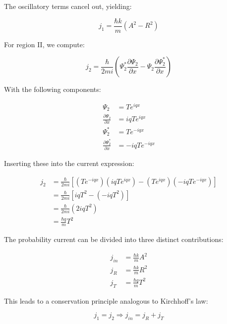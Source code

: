 \documentclass[10pt]{article}
\begin{document}
The oscillatory terms cancel out, yielding:

\begin{equation*}
j_{1}=\frac{\hbar k}{m}\left(A^{2}-R^{2}\right) \tag{6.22}
\end{equation*}

For region II, we compute:

\begin{equation*}
j_{2}=\frac{\hbar}{2 m i}\left(\Psi_{2}^{*} \frac{\partial \Psi_{2}}{\partial x}-\Psi_{2} \frac{\partial \Psi_{2}^{*}}{\partial x}\right) \tag{6.23}
\end{equation*}

With the following components:

\begin{align*}
\Psi_{2} & =T e^{i q x} \\
\frac{\partial \Psi_{2}}{\partial x} & =i q T e^{i q x}  \tag{6.24}\\
\Psi_{2}^{*} & =T e^{-i q x} \\
\frac{\partial \Psi_{2}^{*}}{\partial x} & =-i q T e^{-i q x}
\end{align*}

Inserting these into the current expression:

\begin{align*}
j_{2} & =\frac{\hbar}{2 m i}\left[\left(T e^{-i q x}\right)\left(i q T e^{i q x}\right)-\left(T e^{i q x}\right)\left(-i q T e^{-i q x}\right)\right] \\
& =\frac{\hbar}{2 m i}\left[i q T^{2}-\left(-i q T^{2}\right)\right]  \tag{6.25}\\
& =\frac{\hbar}{2 m i}\left(2 i q T^{2}\right) \\
& =\frac{\hbar q}{m} T^{2}
\end{align*}

The probability current can be divided into three distinct contributions:

\begin{align*}
j_{i n} & =\frac{\hbar k}{m} A^{2} \\
j_{R} & =\frac{\hbar k}{m} R^{2}  \tag{6.26}\\
j_{T} & =\frac{\hbar q}{m} T^{2}
\end{align*}

This leads to a conservation principle analogous to Kirchhoff's law:

\begin{equation*}
j_{1}=j_{2} \Longrightarrow j_{i n}=j_{R}+j_{T} \tag{6.27}
\end{equation*}
\end{document}
